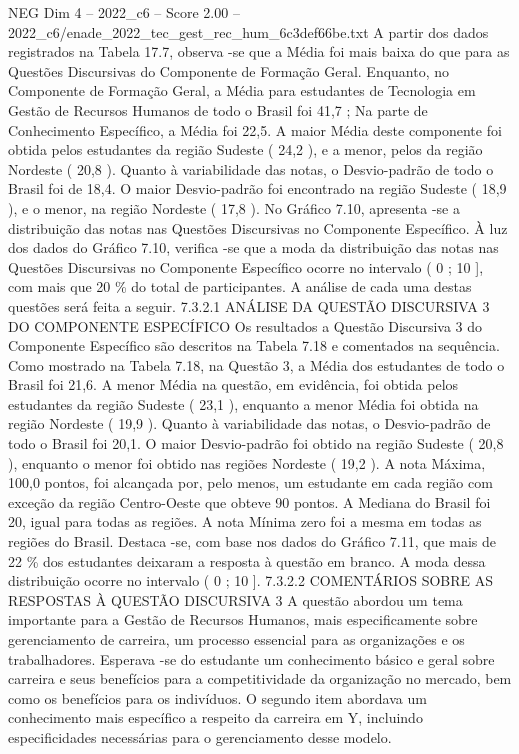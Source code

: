 \begin{textsample}{NEG Dim 4 – 2022\_c6 – Score 2.00 – 2022\_c6/enade\_2022\_tec\_gest\_rec\_hum\_6c3def66be.txt}
A partir dos dados registrados na Tabela 17.7, observa -se que a Média foi mais baixa do que para as Questões Discursivas do Componente de Formação Geral.
Enquanto, no Componente de Formação Geral, a Média para estudantes de Tecnologia em Gestão de Recursos Humanos de todo o Brasil foi 41,7 ; Na parte de Conhecimento Específico, a Média foi 22,5.
A maior Média deste componente foi obtida pelos estudantes da região Sudeste ( 24,2 ), e a menor, pelos da região Nordeste ( 20,8 ).
Quanto à variabilidade das notas, o Desvio-padrão de todo o Brasil foi de 18,4.
O maior Desvio-padrão foi encontrado na região Sudeste ( 18,9 ), e o menor, na região Nordeste ( 17,8 ).
No Gráfico 7.10, apresenta -se a distribuição das notas nas Questões Discursivas no Componente Específico.
À luz dos dados do Gráfico 7.10, verifica -se que a moda da distribuição das notas nas Questões Discursivas no Componente Específico ocorre no intervalo ( 0 ; 10 ], com mais que 20 \% do total de participantes.
A análise de cada uma destas questões será feita a seguir. 7.3.2.1 ANÁLISE DA QUESTÃO DISCURSIVA 3 DO COMPONENTE ESPECÍFICO Os resultados a Questão Discursiva 3 do Componente Específico são descritos na Tabela 7.18 e comentados na sequência.
Como mostrado na Tabela 7.18, na Questão 3, a Média dos estudantes de todo o Brasil foi 21,6.
A menor Média na questão, em evidência, foi obtida pelos estudantes da região Sudeste ( 23,1 ), enquanto a menor Média foi obtida na região Nordeste ( 19,9 ).
Quanto à variabilidade das notas, o Desvio-padrão de todo o Brasil foi 20,1.
O maior Desvio-padrão foi obtido na região Sudeste ( 20,8 ), enquanto o menor foi obtido nas regiões Nordeste ( 19,2 ).
A nota Máxima, 100,0 pontos, foi alcançada por, pelo menos, um estudante em cada região com exceção da região Centro-Oeste que obteve 90 pontos.
A Mediana do Brasil foi 20, igual para todas as regiões.
A nota Mínima zero foi a mesma em todas as regiões do Brasil.
Destaca -se, com base nos dados do Gráfico 7.11, que mais de 22 \% dos estudantes deixaram a resposta à questão em branco.
A moda dessa distribuição ocorre no intervalo ( 0 ; 10 ]. 7.3.2.2 COMENTÁRIOS SOBRE AS RESPOSTAS À QUESTÃO DISCURSIVA 3 A questão abordou um tema importante para a Gestão de Recursos Humanos, mais especificamente sobre gerenciamento de carreira, um processo essencial para as organizações e os trabalhadores.
Esperava -se do estudante um conhecimento básico e geral sobre carreira e seus benefícios para a competitividade da organização no mercado, bem como os benefícios para os indivíduos.
O segundo item abordava um conhecimento mais específico a respeito da carreira em Y, incluindo especificidades necessárias para o gerenciamento desse modelo.

\end{textsample}
